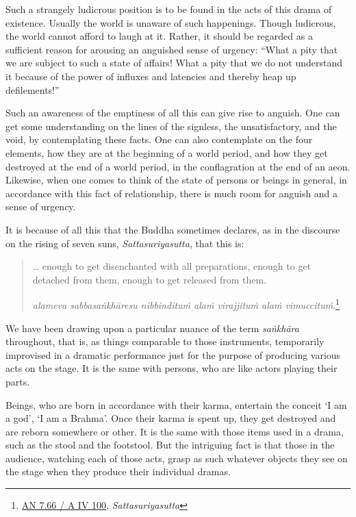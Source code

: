 Such a strangely ludicrous position is to be found in the acts of this drama of existence. Usually the world is unaware of such happenings. Though ludicrous, the world cannot afford to laugh at it. Rather, it should be regarded as a sufficient reason for arousing an anguished sense of urgency: ``What a pity that we are subject to such a state of affairs! What a pity that we do not understand it because of the power of influxes and latencies and thereby heap up defilements!''

Such an awareness of the emptiness of all this can give rise to anguish. One can get some understanding on the lines of the signless, the unsatisfactory, and the void, by contemplating these facts. One can also contemplate on the four elements, how they are at the beginning of a world period, and how they get destroyed at the end of a world period, in the conflagration at the end of an aeon. Likewise, when one comes to think of the state of persons or beings in general, in accordance with this fact of relationship, there is much room for anguish and a sense of urgency.

It is because of all this that the Buddha sometimes declares, as in the discourse on the rising of seven suns, \emph{Sattasuriyasutta}, that this is:

\begin{quote}
\ldots{} enough to get disenchanted with all preparations, enough to get detached from them, enough to get released from them.

\emph{alameva sabbasaṅkhāresu nibbindituṁ alaṁ virajjituṁ alaṁ vimuccituṁ}.\footnote{\href{https://suttacentral.net/an7.66/pli/ms}{AN 7.66 / A IV 100}, \emph{Sattasuriyasutta}}
\end{quote}

We have been drawing upon a particular nuance of the term \emph{saṅkhāra} throughout, that is, as things comparable to those instruments, temporarily improvised in a dramatic performance just for the purpose of producing various acts on the stage. It is the same with persons, who are like actors playing their parts.

Beings, who are born in accordance with their karma, entertain the conceit `I am a god', `I am a Brahma'. Once their karma is spent up, they get destroyed and are reborn somewhere or other. It is the same with those items used in a drama, such as the stool and the footstool. But the intriguing fact is that those in the audience, watching each of those acts, grasp as such whatever objects they see on the stage when they produce their individual dramas.

